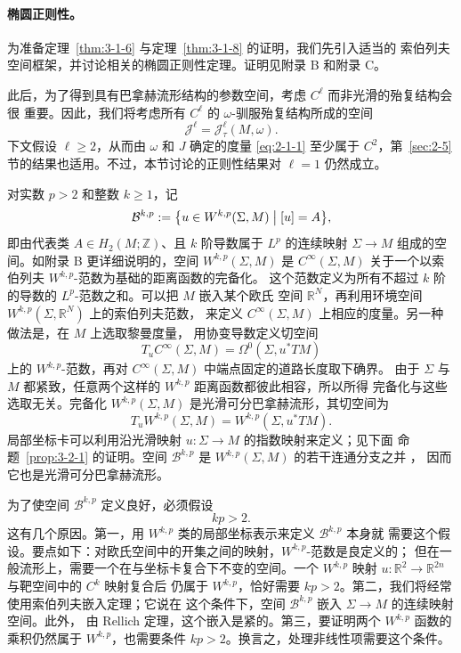 \paragraph{椭圆正则性。}
为准备定理~\ref{thm:3-1-6} 与定理~\ref{thm:3-1-8} 的证明，我们先引入适当的
索伯列夫空间框架，并讨论相关的椭圆正则性定理。证明见附录 B 和附录 C。

此后，为了得到具有巴拿赫流形结构的参数空间，考虑 $C^\ell$ 而非光滑的殆复结构会很
重要。因此，我们将考虑所有 $C^\ell$ 的 $\omega$-驯服殆复结构所成的空间
\[
  \mathcal J^\ell=\mathcal J_\tau^\ell(M,\omega).
\]
下文假设 $\ell\ge2$，从而由 $\omega$ 和 $J$ 确定的度量 \eqref{eq:2-1-1} 至少属于
$C^2$，第~\ref{sec:2-5}节的结果也适用。不过，本节讨论的正则性结果对 $\ell=1$
仍然成立。

对实数 $p>2$ 和整数 $k\ge1$，记
\[
  \mathcal B^{k,p}
  :=\bigl\{u\in W^{k,p}(\Sigma,M)\bigm|[u]=A\bigr\},
\]
即由代表类 $A\in H_2(M;\mathbb Z)$、且 $k$ 阶导数属于 $L^p$ 的连续映射
$\Sigma\to M$ 组成的空间。如附录 B 更详细说明的，空间 $W^{k,p}(\Sigma,M)$ 是
$C^\infty(\Sigma,M)$ 关于一个以索伯列夫 $W^{k,p}$-范数为基础的距离函数的完备化。
这个范数定义为所有不超过 $k$ 阶的导数的 $L^p$-范数之和。可以把 $M$ 嵌入某个欧氏
空间 $\mathbb R^N$，再利用环境空间 $W^{k,p}(\Sigma,\mathbb R^N)$ 上的索伯列夫范数，
来定义 $C^\infty(\Sigma,M)$ 上相应的度量。另一种做法是，在 $M$ 上选取黎曼度量，
用协变导数定义切空间
\[
  T_uC^\infty(\Sigma,M)=\Omega^0(\Sigma,u^*TM)
\]
上的 $W^{k,p}$-范数，再对 $C^\infty(\Sigma,M)$ 中端点固定的道路长度取下确界。
由于 $\Sigma$ 与 $M$ 都紧致，任意两个这样的 $W^{k,p}$ 距离函数都彼此相容，所以所得
完备化与这些选取无关。完备化 $W^{k,p}(\Sigma,M)$ 是光滑可分巴拿赫流形，其切空间为
\[
  T_uW^{k,p}(\Sigma,M)=W^{k,p}(\Sigma,u^*TM).
\]
局部坐标卡可以利用沿光滑映射 $u:\Sigma\to M$ 的指数映射来定义；见下面
命题~\ref{prop:3-2-1} 的证明。空间 $\mathcal B^{k,p}$ 是
$W^{k,p}(\Sigma,M)$ 的若干连通分支之并
，
因而它也是光滑可分巴拿赫流形。

为了使空间 $\mathcal B^{k,p}$ 定义良好，必须假设
\[
  kp>2.
\]
这有几个原因。第一，用 $W^{k,p}$ 类的局部坐标表示来定义 $\mathcal B^{k,p}$ 本身就
需要这个假设。要点如下：对欧氏空间中的开集之间的映射，$W^{k,p}$-范数是良定义的；
但在一般流形上，需要一个在与坐标卡复合下不变的空间。一个
$W^{k,p}$ 映射 $u:\mathbb R^2\to\mathbb R^{2n}$ 与靶空间中的 $C^k$ 映射复合后
仍属于 $W^{k,p}$，恰好需要 $kp>2$。第二，我们将经常使用索伯列夫嵌入定理；它说在
这个条件下，空间 $\mathcal B^{k,p}$ 嵌入 $\Sigma\to M$ 的连续映射空间。此外，
由 Rellich 定理，这个嵌入是紧的。第三，要证明两个 $W^{k,p}$ 函数的乘积仍然属于
$W^{k,p}$，也需要条件 $kp>2$。换言之，处理非线性项需要这个条件。

